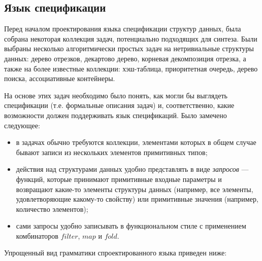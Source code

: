 \documentclass[14pt]{matmex-diploma-custom}
\begin{document}
\subsection{Язык спецификации}
Перед началом проектирования языка спецификации структур данных, была собрана некоторая коллекция задач, потенциально подходящих для синтеза. Были выбраны несколько алгоритмически простых задач на нетривиальные структуры данных: дерево отрезков, декартово дерево, корневая декомпозиция отрезка, а также на более известные коллекции: хэш-таблица, приоритетная очередь, дерево поиска, ассоциативные контейнеры.

На основе этих задач необходимо было понять, как могли бы выглядеть спецификации (т.е. формальные описания задач) и, соответственно, какие возможности должен поддерживать язык спецификаций. Было замечено следующее:
\begin{itemize}
    \item в задачах обычно требуются коллекции, элементами которых в общем случае бывают записи из нескольких элементов примитивных типов;
    \item действия над структурами данных удобно представлять в виде \textit{запросов} --- функций, которые принимают примитивные входные параметры и возвращают какие-то элементы структуры данных (например, все элементы, удовлетворяющие какому-то свойству) или примитивные значения (например, количество элементов);
    \item сами запросы удобно записывать в функциональном стиле с применением комбинаторов $filter$, $map$ и $fold$.
\end{itemize}

 Упрощенный вид грамматики спроектированного языка приведен ниже:
\end{document}
